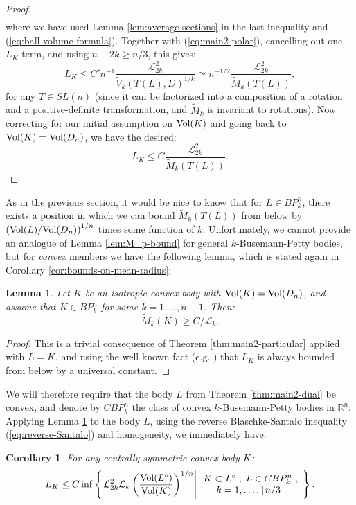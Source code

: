 \documentclass[12pt,oneside]{amsart}
\newtheorem{cor}[thm]{Corollary}
\newtheorem{lem}[thm]{Lemma}
\theoremstyle{definition}
\theoremstyle{remark}
\theoremstyle{proof}
\numberwithin{equation}{section}
\newcommand{\set}[1]{\left\{#1\right\}}
\newcommand{\brac}[1]{\left(#1\right)}
\newcommand{\Real}{\mathbb{R}}
\newcommand{\BP}{BP}
\renewcommand{\MR}{\widetilde{M}} %
\renewcommand{\L}{\mathcal{L}}
\newcommand{\Lk}{\mathcal{L}_k}
\newcommand{\Vol}[1]{\textnormal{Vol} (#1)}
\newcommand{\sVolRatio}[2]{\brac{\Vol{#1}/\Vol{#2}}^{1/n}}
\newcommand{\VolRatio}[2]{\brac{\frac{\Vol{#1}}{\Vol{#2}}}^{1/n}}
\begin{document}
\begin{proof}
\begin{eqnarray}
\end{eqnarray}
where we have used Lemma \ref{lem:average-sections} in the last
inequality and (\ref{eq:ball-volume-formula}).
Together with (\ref{eq:main2-polar}), cancelling out one $L_K$
term, and using $n - 2k \geq n/3$, this gives:
\begin{equation} \label{eq:main2-dual-L_K-bound}
L_K \leq C' n^{-1} \frac{\L^2_{2k}}{\widetilde{V}_k(T(L),D)^{1/k}}
\simeq n^{-1/2} \frac{\L^2_{2k}}{\MR_k(T(L))},
\end{equation}
for any $T \in SL(n)$ (since it can be factorized into a
composition of a rotation and a positive-definite transformation,
and $\MR_k$ is invariant to rotations). Now correcting for our
initial assumption on $\Vol{K}$ and going back to
$\Vol{K}=\Vol{D_n}$, we have the desired:
\[
L_K \leq C \frac{\L^2_{2k}}{\MR_k(T(L))}.
\]
\end{proof}

As in the previous section, it would be nice to know that for $L
\in \BP_k^n$, there exists a position in which we can bound
$\MR_k(T(L))$ from below by $\sVolRatio{L}{D_n}$ times some
function of $k$. Unfortunately, we cannot provide an analogue of
Lemma \ref{lem:M_p-bound} for general $k$-Busemann-Petty bodies,
but for \emph{convex} members we have the following lemma, which
is stated again in Corollary \ref{cor:bounds-on-mean-radius}:
\begin{lem} \label{lem:MR_k-bound}
Let $K$ be an isotropic convex body with $\Vol{K} = \Vol{D_n}$,
and assume that $K\in \BP_k^n$ for some $k=1,\ldots,n-1$. Then:
\[
\MR_k(K) \geq C / \Lk.
\]
\end{lem}
\begin{proof}
This is a trivial consequence of Theorem
\ref{thm:main2-particular} applied with $L=K$, and using the well
known fact (e.g. \cite{Milman-Pajor-LK}) that $L_K$ is always
bounded from below by a universal constant.
\end{proof}


We will therefore require that the body $L$ from Theorem
\ref{thm:main2-dual} be convex, and denote by $C\BP_k^n$ the class
of convex $k$-Busemann-Petty bodies in $\Real^n$. Applying Lemma
\ref{lem:MR_k-bound} to the body $L$, using the reverse
Blaschke-Santalo inequality (\ref{eq:reverse-Santalo}) and
homogeneity, we immediately have:

\begin{cor}
For any centrally symmetric convex body $K$:
\[
L_K \leq C \inf \set{\left . \L_{2k}^2 \Lk \VolRatio{L^\circ}{K}
\right | \begin{array}{c} K \subset L^\circ \; , \; L \in
C\BP_k^n \; , \\ k = 1,\ldots,\lfloor n/3 \rfloor \end{array} }.
\]
\end{cor}
\end{document}
